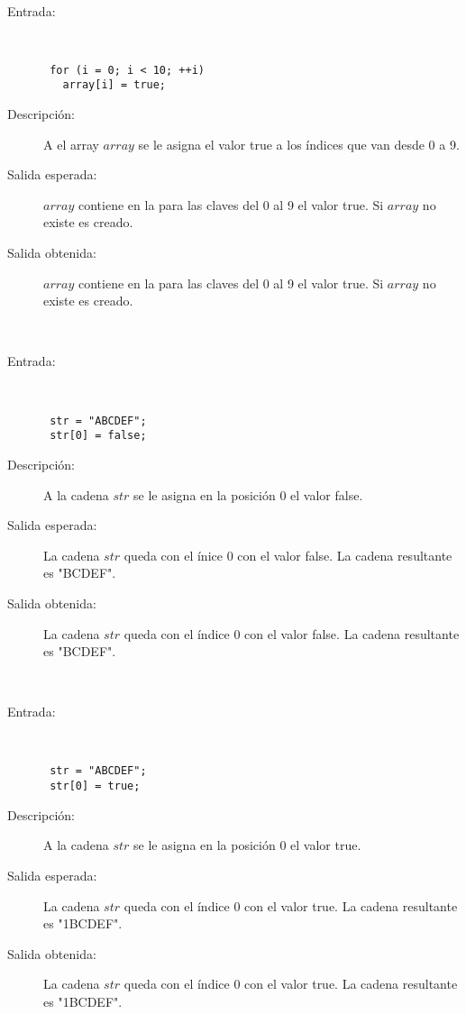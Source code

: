 \hfil \\
	\begin{description}
		\item [Entrada:] \hfill \\
\begin{lstlisting}
 for (i = 0; i < 10; ++i) 
   array[i] = true;
\end{lstlisting}
		\item [Descripción:] A el array $array$ se le asigna el valor true a los índices que van desde 0 a 9.
		\item [Salida esperada:] $array$ contiene en la para las claves del 0 al 9 el valor true. Si $array$ no existe es creado.
		\item [Salida obtenida:] $array$ contiene en la para las claves del 0 al 9 el valor true. Si $array$ no existe es creado.
	\end{description}
\hfil \\
	\begin{description}
		\item [Entrada:] \hfill \\
\begin{lstlisting}
 str = "ABCDEF"; 
 str[0] = false;
\end{lstlisting}
		\item [Descripción:] A la cadena $str$ se le asigna en la posición 0 el valor false.
		\item [Salida esperada:] La cadena $str$ queda con el ínice $0$ con el valor false. La cadena resultante es "BCDEF".
		\item [Salida obtenida:] La cadena $str$ queda con el índice $0$ con el valor false. La cadena resultante es "BCDEF".
	\end{description}
\hfil \\
	\begin{description}
		\item [Entrada:] \hfill \\
\begin{lstlisting}
 str = "ABCDEF"; 
 str[0] = true;
\end{lstlisting}
		\item [Descripción:] A la cadena $str$ se le asigna en la posición 0 el valor true.
		\item [Salida esperada:] La cadena $str$ queda con el índice $0$ con el valor true. La cadena resultante es "1BCDEF".
		\item [Salida obtenida:] La cadena $str$ queda con el índice $0$ con el valor true. La cadena resultante es "1BCDEF".
	\end{description}
